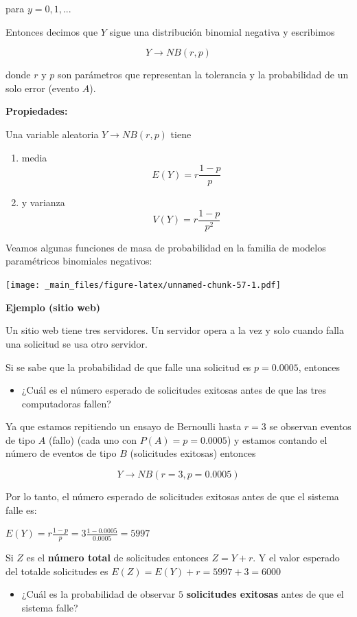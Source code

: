\documentclass[
]{book}
\providecommand{\tightlist}{%
  \setlength{\itemsep}{0pt}\setlength{\parskip}{0pt}}
\begin{document}
para \(y=0,1,...\)

Entonces decimos que \(Y\) sigue una distribución binomial negativa y escribimos

\[Y\rightarrow NB(r,p)\]

donde \(r\) y \(p\) son parámetros que representan la tolerancia y la probabilidad de un solo error (evento \(A\)).

\textbf{Propiedades:}

Una variable aleatoria \(Y\rightarrow NB(r,p)\) tiene

\begin{enumerate}
\def\labelenumi{\arabic{enumi})}
\item
  media \[E(Y)= r\frac{1-p}{p}\]
\item
  y varianza \[V(Y)= r\frac{1-p}{p^2}\]
\end{enumerate}

Veamos algunas funciones de masa de probabilidad en la familia de modelos paramétricos binomiales negativos:

\texttt{[image: \_main\_files/figure-latex/unnamed-chunk-57-1.pdf]}

\textbf{Ejemplo (sitio web)}

Un sitio web tiene tres servidores. Un servidor opera a la vez y solo cuando falla una solicitud se usa otro servidor.

Si se sabe que la probabilidad de que falle una solicitud es \(p=0.0005\), entonces

\begin{itemize}
\tightlist
\item
  ¿Cuál es el número esperado de solicitudes exitosas antes de que las tres computadoras fallen?
\end{itemize}

Ya que estamos repitiendo un ensayo de Bernoulli hasta \(r=3\) se observan eventos de tipo \(A\) (fallo) (cada uno con \(P(A)=p=0.0005\)) y estamos contando el número de eventos de tipo \(B\) (solicitudes exitosas) entonces

\[Y \rightarrow NB(r=3, p=0.0005)\]

Por lo tanto, el número esperado de solicitudes exitosas antes de que el sistema falle es:

\(E(Y)=r\frac{1-p}{p}=3\frac{1-0.0005}{0.0005}=5997\)

Si \(Z\) es el \textbf{número total} de solicitudes entonces \(Z=Y+r\). Y el valor esperado del totalde solicitudes es \(E(Z)=E(Y)+r=5997+3=6000\)

\begin{itemize}
\tightlist
\item
  ¿Cuál es la probabilidad de observar \(5\) \textbf{solicitudes exitosas} antes de que el sistema falle?
\end{itemize}
\end{document}
